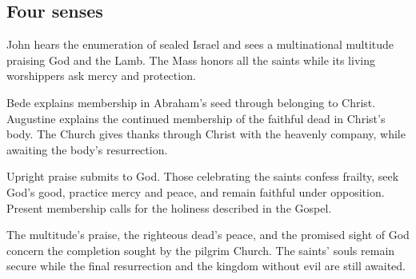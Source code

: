 \subsection{Four senses}
\begin{fourSenses}
\item[Literal.] John hears the enumeration of sealed Israel and sees a
multinational multitude praising God and the Lamb. The Mass honors all the
saints while its living worshippers ask mercy and protection.
\item[Allegorical.] Bede explains membership in Abraham's seed through
belonging to Christ. Augustine explains the continued membership of the
faithful dead in Christ's body. The Church gives thanks through Christ
with the heavenly company, while awaiting the body's resurrection.
\item[Moral.] Upright praise submits to God. Those celebrating the saints
confess frailty, seek God's good, practice mercy and peace, and remain
faithful under opposition. Present membership calls for the holiness
described in the Gospel.
\item[Anagogical.] The multitude's praise, the righteous dead's peace, and
the promised sight of God concern the completion sought by the pilgrim
Church. The saints' souls remain secure while the final resurrection
and the kingdom without evil are still awaited.
\end{fourSenses}
